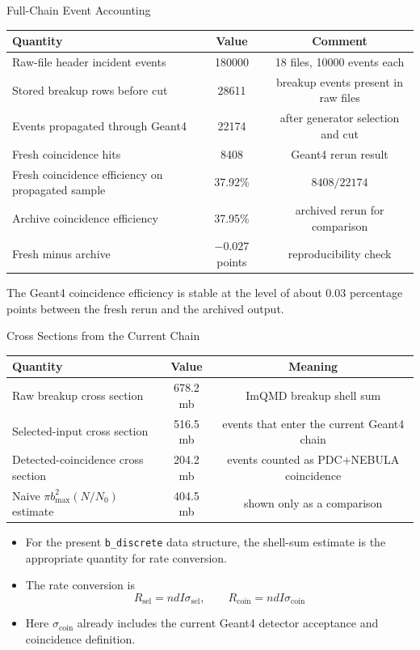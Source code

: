 \documentclass[aspectratio=169]{beamer}
\begin{document}
\begin{frame}{Full-Chain Event Accounting}
\small
\centering
\begin{tabular}{>{\raggedright\arraybackslash}p{4.4cm}cc}
\toprule
Quantity & Value & Comment \\
\midrule
Raw-file header incident events & 180000 & 18 files, 10000 events each \\
Stored breakup rows before cut & 28611 & breakup events present in raw files \\
Events propagated through Geant4 & 22174 & after generator selection and cut \\
Fresh coincidence hits & 8408 & Geant4 rerun result \\
Fresh coincidence efficiency on propagated sample & 37.92\% & $8408 / 22174$ \\
Archive coincidence efficiency & 37.95\% & archived rerun for comparison \\
Fresh minus archive & $-0.027$ points & reproducibility check \\
\bottomrule
\end{tabular}

\vspace{0.2cm}
\small
The Geant4 coincidence efficiency is stable at the level of about $0.03$ percentage points between the fresh rerun and the archived output.
\end{frame}

\begin{frame}{Cross Sections from the Current Chain}
\small
\centering
\begin{tabular}{>{\raggedright\arraybackslash}p{4.8cm}cc}
\toprule
Quantity & Value & Meaning \\
\midrule
Raw breakup cross section & 678.2 mb & ImQMD breakup shell sum \\
Selected-input cross section & 516.5 mb & events that enter the current Geant4 chain \\
Detected-coincidence cross section & 204.2 mb & events counted as PDC+NEBULA coincidence \\
Naive $\pi b_{\max}^2 (N/N_0)$ estimate & 404.5 mb & shown only as a comparison \\
\bottomrule
\end{tabular}

\vspace{0.25cm}
\begin{itemize}
  \item For the present \texttt{b\_discrete} data structure, the shell-sum estimate is the appropriate quantity for rate conversion.
  \item The rate conversion is
  \[
  R_{\mathrm{sel}} = n d I \sigma_{\mathrm{sel}},\qquad
  R_{\mathrm{coin}} = n d I \sigma_{\mathrm{coin}}
  \]
  \item Here $\sigma_{\mathrm{coin}}$ already includes the current Geant4 detector acceptance and coincidence definition.
\end{itemize}
\end{frame}
\end{document}
